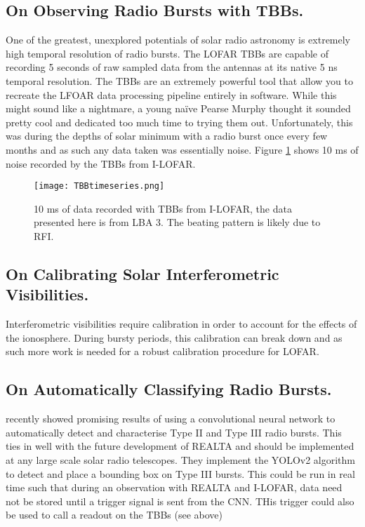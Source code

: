 \subsection{On Observing Radio Bursts with TBBs.}
One of the greatest, unexplored potentials of solar radio astronomy is extremely high temporal resolution of radio bursts. The LOFAR TBBs are capable of recording 5 seconds of raw sampled data from the antennas at its native 5 ns temporal resolution. The TBBs are an extremely powerful tool that allow you to recreate the LFOAR data processing pipeline entirely in software. While this might sound like a nightmare, a young na\"ive Pearse Murphy thought it sounded pretty cool and dedicated too much time to trying them out. Unfortunately, this was during the depths of solar minimum with a radio burst once every few months and as such any data taken was essentially noise. Figure \ref{fig:TBB_timeseries} shows 10 ms of noise recorded by the TBBs from I-LOFAR.
%
\begin{figure}[ht]
\centering
\texttt{[image: TBBtimeseries.png]}
\caption[10 ms of data recorded with TBBs from I-LOFAR.]{10 ms of data recorded with TBBs from I-LOFAR, the data presented here is from LBA 3. The beating pattern is likely due to RFI.}
\label{fig:TBB_timeseries}
\end{figure}

\subsection{On Calibrating Solar Interferometric Visibilities.}
Interferometric visibilities require calibration in order to account for the effects of the ionosphere. During bursty periods, this calibration can break down and as such more work is needed for a robust calibration procedure for LOFAR.

\subsection{On Automatically Classifying Radio Bursts.}
\cite{Scully2021} recently showed promising results of using a convolutional neural network to automatically detect and characterise Type II and Type III radio bursts. This ties in well with the future development of REALTA and should be implemented at any large scale solar radio telescopes. They implement the YOLOv2 algorithm to detect and place a bounding box on Type III bursts. This could be run in real time such that during an observation with REALTA and I-LOFAR, data need not be stored until a trigger signal is sent from the CNN. THis trigger could also be used to call a readout on the TBBs (see above)

